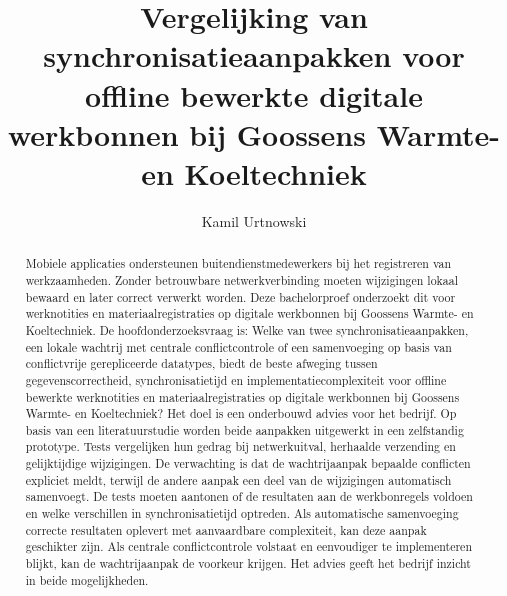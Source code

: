 \documentclass{hogent-article}
\title{Vergelijking van synchronisatieaanpakken voor offline bewerkte digitale werkbonnen bij Goossens Warmte- en Koeltechniek}
\author{Kamil Urtnowski}
\begin{document}
\begin{abstract}
Mobiele applicaties ondersteunen buitendienstmedewerkers bij het registreren van werkzaamheden.
Zonder betrouwbare netwerkverbinding moeten wijzigingen lokaal bewaard en later correct verwerkt worden.
Deze bachelorproef onderzoekt dit voor werknotities en materiaalregistraties op digitale werkbonnen bij
Goossens Warmte- en Koeltechniek. De hoofdonderzoeksvraag is:
Welke van twee synchronisatieaanpakken, een lokale wachtrij met centrale conflictcontrole of een samenvoeging op basis van conflictvrije gerepliceerde datatypes,
biedt de beste afweging tussen gegevenscorrectheid, synchronisatietijd en implementatiecomplexiteit voor offline bewerkte
werknotities en materiaalregistraties op digitale werkbonnen bij Goossens Warmte- en Koeltechniek?
Het doel is een onderbouwd advies voor het bedrijf.
Op basis van een literatuurstudie worden beide aanpakken uitgewerkt in een zelfstandig prototype. Tests vergelijken hun
gedrag bij netwerkuitval, herhaalde verzending en gelijktijdige wijzigingen. De verwachting is dat de
wachtrijaanpak bepaalde conflicten expliciet meldt, terwijl de andere aanpak een deel van de wijzigingen
automatisch samenvoegt. De tests moeten aantonen of de resultaten aan de werkbonregels voldoen en welke
verschillen in synchronisatietijd optreden. Als automatische samenvoeging correcte resultaten oplevert
met aanvaardbare complexiteit, kan deze aanpak geschikter zijn. Als centrale conflictcontrole volstaat
en eenvoudiger te implementeren blijkt, kan de wachtrijaanpak de voorkeur krijgen. Het advies geeft het
bedrijf inzicht in beide mogelijkheden.
\end{abstract}

\tableofcontents



\printbibliography[heading=bibintoc]
\end{document}
